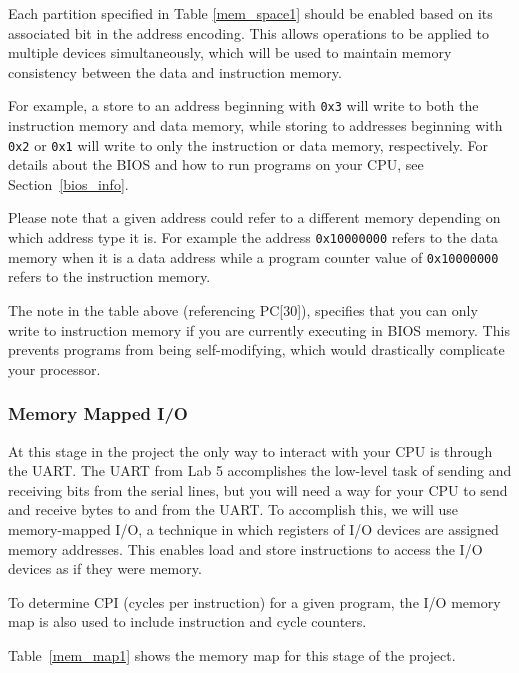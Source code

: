 \documentclass[11pt]{article}
\begin{document}
Each partition specified in Table \ref{mem_space1} should be enabled based on its associated bit in the address encoding.
This allows operations to be applied to multiple devices simultaneously, which will be used to maintain memory consistency between the data and instruction memory.

For example, a store to an address beginning with \verb|0x3| will write to both the instruction memory and data memory, while storing to addresses beginning with \verb|0x2| or \verb|0x1| will write to only the instruction or data memory, respectively.
For details about the BIOS and how to run programs on your CPU, see Section~\ref{bios_info}.

Please note that a given address could refer to a different memory depending on which address type it is.
For example the address \verb|0x10000000| refers to the data memory when it is a data address while a program counter value of \verb|0x10000000| refers to the instruction memory.

The note in the table above (referencing PC[30]), specifies that you can only write to instruction memory if you are currently executing in BIOS memory.
This prevents programs from being self-modifying, which would drastically complicate your processor.

\subsubsection{Memory Mapped I/O}
\label{mmio}
At this stage in the project the only way to interact with your CPU is through the UART.
The UART from Lab 5 accomplishes the low-level task of sending and receiving bits from the serial lines, but you will need a way for your CPU to send and receive bytes to and from the UART.
To accomplish this, we will use memory-mapped I/O, a technique in which registers of I/O devices are assigned memory addresses.
This enables load and store instructions to access the I/O devices as if they were memory.

To determine CPI (cycles per instruction) for a given program, the I/O memory map is also used to include instruction and cycle counters.

Table~\ref{mem_map1} shows the memory map for this stage of the project.
\end{document}
